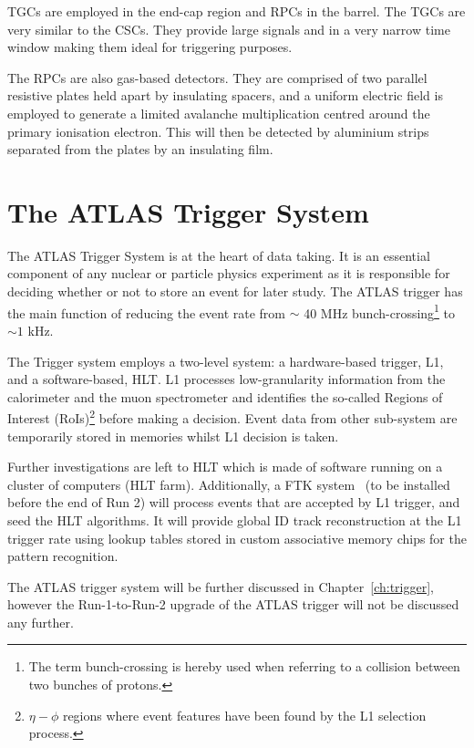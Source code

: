 			\acp{TGC} are employed in the end-cap region and \acp{RPC} in the barrel. The \acp{TGC} are very similar to the \acp{CSC}. They provide large signals and in a very narrow time window making them ideal for triggering purposes.

			The \acp{RPC} are also gas-based detectors. They are comprised of two parallel resistive plates held apart by insulating spacers, and a uniform electric field is employed to generate a limited avalanche multiplication centred around the primary ionisation electron. This will then be detected by aluminium strips separated from the plates by an insulating film.




	\section{The ATLAS Trigger System}
	\label{sec:trigSyst}

		The \ac{ATLAS} Trigger System is at the heart of data taking. It is an essential component of any nuclear or particle physics experiment as it is responsible for deciding whether or not to store an event for later study. The \ac{ATLAS} trigger has the main function of reducing the event rate from $\sim$ 40 MHz bunch-crossing\footnote{The term bunch-crossing is hereby used when referring to a collision between two bunches of protons.} to $\sim 1$ kHz.

		The Trigger system employs a two-level system: a hardware-based trigger, \ac{L1}, and a software-based, \ac{HLT}. \ac{L1} processes low-granularity information from the calorimeter and the muon spectrometer and identifies the so-called Regions of Interest (RoIs)\footnote{$\eta - \phi$ regions where event features have been found by the \ac{L1} selection process.} before making a decision. Event data from other sub-system are temporarily stored in memories whilst \ac{L1} decision is taken.
		
		Further investigations are left to \ac{HLT} which is made of software running on a cluster of computers (\ac{HLT} farm). Additionally, a \ac{FTK} system~\cite{FTKTDR} (to be installed before the end of Run 2) will process events that are accepted by \ac{L1} trigger, and seed the \ac{HLT} algorithms. It will provide global \ac{ID} track reconstruction at the \ac{L1} trigger rate using lookup tables stored in custom associative memory chips for the pattern recognition.
		
		The \ac{ATLAS} trigger system will be further discussed in Chapter~\ref{ch:trigger}, however the Run-1-to-Run-2 upgrade of the \ac{ATLAS} trigger will not be discussed any further.